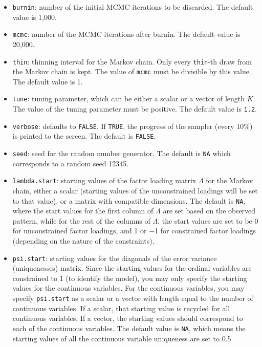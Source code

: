 \begin{itemize}
\item \texttt{burnin}: number of the initial MCMC iterations to be 
 discarded. The default value is 1,000.

\item \texttt{mcmc}: number of the MCMC iterations after burnin.
 The default value is 20,000.

\item \texttt{thin}: thinning interval for the Markov chain. Only every 
 \texttt{thin}-th draw from the Markov chain is kept. The value of 
\texttt{mcmc} must be divisible by this value. The default value is 1.

\item \texttt{tune}: tuning parameter, which can be either a
scalar or a vector of length $K$. The value of the tuning parameter
must be positive. The default value is \texttt{1.2}.

\item \texttt{verbose}: defaults to {\tt FALSE}. If \texttt{TRUE}, the progress 
 of the sampler (every $10\%$) is printed to the screen. The default 
is \texttt{FALSE}.

\item \texttt{seed}: seed for the random number generator. The default
is \texttt{NA} which corresponds to a random seed 12345.

\item \texttt{lambda.start}: starting values of the factor loading
matrix $\Lambda$ for the Markov chain, either a scalar (starting
values of the unconstrained loadings will be set to that value), or a
matrix with compatible dimensions.  The default is \texttt{NA}, where
the start values for the first column of $\Lambda$ are set based on
the observed pattern, while for the rest of the columns of $\Lambda$,
the start values are set to be 0 for unconstrained factor loadings,
and 1 or $-$1 for constrained factor loadings (depending on the nature
of the constraints).

\item \texttt{psi.start}: starting values for the diagonals of the error variance
(uniquenesses) matrix. Since the starting values for the ordinal
variables are constrained to 1 (to identify the model), you may only
specify the starting values for the continuous variables.  For the
continuous variables, you may specify {\tt psi.start} as a scalar or a
vector with length equal to the number of continuous variables.  If a
scalar, that starting value is recycled for all continuous variables.
If a vector, the starting values should correspond to each of the
continuous variables.  The default value is \texttt{NA}, which means
the starting values of all the continuous variable uniqueness are set
to 0.5.


\end{itemize}
